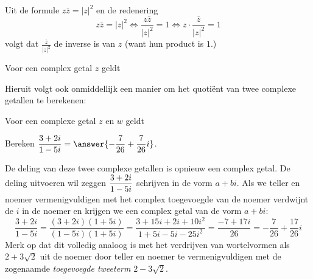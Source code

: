 \documentclass{ximera}
\begin{document}
	\author{Wim Obbels}
	\label{xim:cmplx_deling}

    Uit de formule $z\overline{z} = |z|^2$ en de redenering
    $$
    z\overline{z} = |z|^2 \iff \frac{z\overline{z}}{|z|^2}=1 \iff z\cdot \frac{\overline{z}}{|z|^2}=1 
    $$
    volgt dat $\frac{\overline{z}}{|z|^2}$ de inverse is van $z$ (want hun product is $1$.)

    \begin{proposition} Voor een complex getal $z$ geldt
    \end{proposition}

    Hieruit volgt ook onmiddellijk een manier om het quotiënt van twee complexe getallen te berekenen:

    \begin{proposition} Voor een complexe getal $z$ en $w$ geldt
    \end{proposition}
    
\begin{example} Bereken $\ds\frac{3+2i}{1-5i} =\answer{-\frac{7}{26}+\frac{7}{26}i}$.

    \begin{oplossing}
    De deling van deze twee complexe getallen is opnieuw een complex getal. De deling uitvoeren wil zeggen $\displaystyle \frac{3+2i}{1-5i}$ schrijven in de vorm $a+bi$. Als we teller en noemer vermenigvuldigen met het complex toegevoegde van de noemer verdwijnt de $i$ in de noemer en krijgen we een complex getal van de vorm $a+bi$:
    $$
    \frac{3+2i}{1-5i}= \frac{(3+2i)(1+5i)}{(1-5i)(1+5i)}=\frac{3+15i+2i+10 i^2}{1+5i-5i-25 i^2}=\frac{-7+17i}{26}= - \frac{7}{26} + \frac{17}{26}i
    $$
    Merk op dat dit volledig analoog is met het verdrijven van wortelvormen als $2+3\sqrt{2}$ uit de noemer door teller en noemer te vermenigvuldigen met de zogenaamde \textit{toegevoegde tweeterm} $2-3\sqrt{2}$.

    \end{oplossing}
\end{example}
\end{document}
